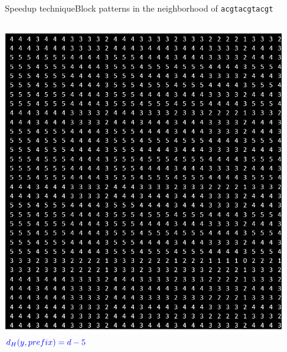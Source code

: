 \documentclass[pdf,xcolor={dvipsnames}]{beamer}
\begin{document}
\begin{frame}{Speedup technique}{Block patterns in the neighborhood of \texttt{acgtacgtacgt}}
\begin{columns}
\begin{column}{0.3\textwidth}
				\includegraphics[width=0.9\textwidth]{img/5.png}\\ $\color{blue}d_H(y,prefix) = d-5$\\\ \\
			\end{column}
		\end{columns}
	\end{frame}
\end{document}
